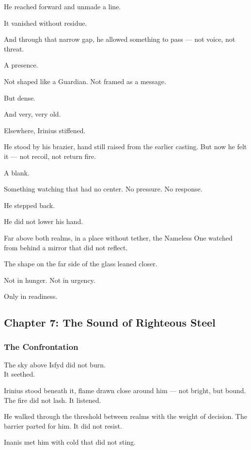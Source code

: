 \documentclass[12pt]{article}
\begin{document}
He reached forward and unmade a line.

It vanished without residue.

And through that narrow gap, he allowed something to pass — not voice, not threat.

A presence.

Not shaped like a Guardian. Not framed as a message.

But dense.

And very, very old.

Elsewhere, Irinius stiffened.

He stood by his brazier, hand still raised from the earlier casting. But now he felt it — not recoil, not return fire.

A blank.

Something watching that had no center. No pressure. No response.

He stepped back.

He did not lower his hand.

Far above both realms, in a place without tether, the Nameless One watched from behind a mirror that did not reflect.

The shape on the far side of the glass leaned closer.

Not in hunger. Not in urgency.

Only in readiness.

\newpage

\subsection*{Chapter 7: The Sound of Righteous Steel}

\vspace{.5in}

\subsubsection*{The Confrontation}

The sky above Isfyd did not burn.\\
It seethed.

Irinius stood beneath it, flame drawn close around him — not bright, but bound. The fire did not lash. It listened.

He walked through the threshold between realms with the weight of decision. The barrier parted for him. It did not resist.

Inanis met him with cold that did not sting.
\end{document}
